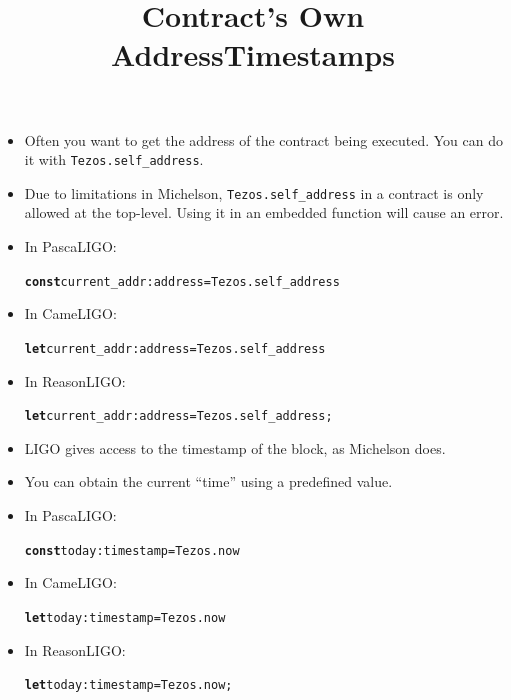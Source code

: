 \documentclass[wide]{slides}
\newcommand{\Kconst}[0]{\textbf{const}\xspace}
\newcommand{\Klet}[0]{\textbf{let}\xspace}
\begin{document}
\begin{slide}
  \title{Contract's Own Address}

  \begin{itemize}

    \item Often you want to get the address of the contract being
      executed. You can do it with \texttt{Tezos.self\_address}.

    \item Due to limitations in Michelson,
      \texttt{Tezos.self\_address} in a contract is only allowed at
      the top-level. Using it in an embedded function will cause an
      error.

    \item In PascaLIGO:
      \begin{alltt}
\Kconst current_addr : address = Tezos.self_address
      \end{alltt}

    \item In CameLIGO:
      \begin{alltt}
\Klet current_addr : address = Tezos.self_address
      \end{alltt}

    \item In ReasonLIGO:
      \begin{alltt}
\Klet current_addr : address = Tezos.self_address;
      \end{alltt}

  \end{itemize}

\end{slide}

\begin{slide}
  \title{Timestamps}

  \begin{itemize}

    \item LIGO gives access to the timestamp of the block, as
      Michelson does.

    \item You can obtain the current ``time'' using a predefined
      value.

    \item In PascaLIGO:
      \begin{alltt}
\Kconst today : timestamp = Tezos.now
      \end{alltt}

    \item In CameLIGO:
      \begin{alltt}
\Klet today : timestamp = Tezos.now
      \end{alltt}

    \item In ReasonLIGO:
      \begin{alltt}
\Klet today : timestamp = Tezos.now;
      \end{alltt}

  \end{itemize}

\end{slide}
\end{document}
